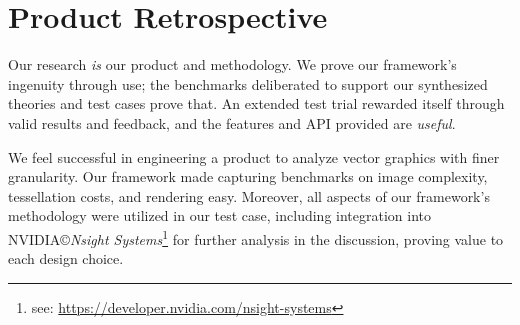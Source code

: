 \section{Product Retrospective}
Our research \emph{is} our product and methodology. We prove our framework's ingenuity through use; the benchmarks deliberated to support our synthesized theories and test cases prove that. An extended test trial rewarded itself through valid results and feedback, and the features and API provided are \emph{useful}.\medskip

We feel successful in engineering a product to analyze vector graphics with finer granularity. Our framework made capturing benchmarks on image complexity, tessellation costs, and rendering easy. Moreover, all aspects of our framework's methodology were utilized in our test case, including integration into NVIDIA\copyright \textit{Nsight Systems}\footnote{see: \href{https://developer.nvidia.com/nsight-systems}{https://developer.nvidia.com/nsight-systems}} for further analysis in the discussion, proving value to each design choice.